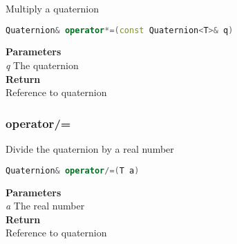 \begin{mdframed}
Multiply a quaternion
\begin{lstlisting}[language=C++]
Quaternion& operator*=(const Quaternion<T>& q)
\end{lstlisting}
\textbf{Parameters} \\ 
\textit{q} The quaternion \\ 
\textbf{Return} \\ 
Reference to quaternion\\ 
\end{mdframed}

\subsubsection{operator/=}
\begin{mdframed}
Divide the quaternion by a real number
\begin{lstlisting}[language=C++]
Quaternion& operator/=(T a)
\end{lstlisting}
\textbf{Parameters} \\ 
\textit{a} The real number \\ 
\textbf{Return} \\ 
Reference to quaternion\\ 
\end{mdframed}

